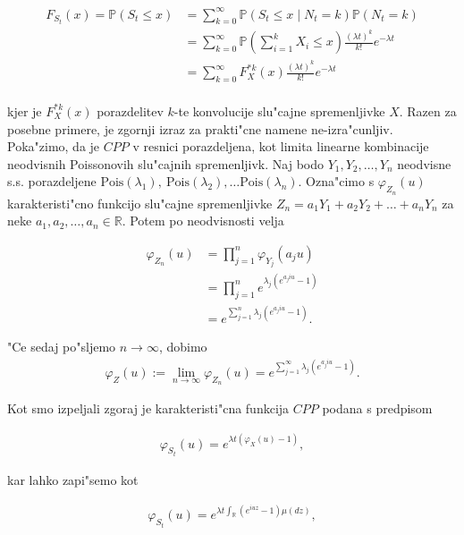 \documentclass[12pt, a4paper, reqno]{amsart}
\theoremstyle{definition} %
\theoremstyle{plain} %
\newcommand{\R}{\mathbb{R}}
\newcommand{\Prob}{\mathbb{P}}
\newcommand{\1}{\mathds{1}}
\newcommand{\Pois}[1]{\text{Pois}(#1)}
\begin{document}
    \begin{align*}
        F_{S_t}(x) = \Prob(S_t \leq x) 
        &= \sum_{k=0}^\infty \Prob(S_t \leq x \mid N_t = k)\Prob(N_t = k) \\
        & = \sum_{k=0}^\infty \Prob(\sum_{i=1}^k X_i \leq x)\frac{(\lambda t)^k}{k!}e^{-\lambda t} \\
        & = \sum_{k=0}^\infty F_X^{*k}(x)\frac{(\lambda t)^k}{k!}e^{-\lambda t} \\
    \end{align*}

    \noindent
    kjer je $F_X^{*k}(x)$ porazdelitev $k$-te konvolucije slu"cajne spremenljivke $X$. Razen za 
    posebne primere, je zgornji izraz za prakti"cne namene ne-izra"cunljiv. 
    Poka"zimo, da je $CPP$ v resnici porazdeljena, kot limita linearne kombinacije neodvisnih Poissonovih
    slu"cajnih spremenljivk. Naj bodo $Y_1, Y_2, \dots, Y_n$ neodvisne s.s. porazdeljene 
    $\Pois{\lambda_1}, \ \Pois{\lambda_2}, \dots \Pois{\lambda_n}$. Ozna"cimo s $\varphi_{Z_n}(u)$ 
    karakteristi"cno funkcijo slu"cajne spremenljivke $Z_n = a_1Y_1 + a_2Y_2 + \dots + a_nY_n$ za neke 
    $a_1, a_2, \dots, a_n \in \R$.
    Potem po neodvisnosti velja

    \begin{align*}
        \varphi_{Z_n}(u) 
                &= \prod_{j=1}^{n}\varphi_{Y_j}(a_ju)\\
                &= \prod_{j=1}^{n}e^{\lambda_j\left(e^{a_j i u} - 1\right)} \\
                &= e^{\sum_{j=1}^{n}\lambda_j\left(e^{a_j i u} - 1\right)}.
    \end{align*}

    \noindent
    "Ce sedaj po"sljemo $n \to \infty$, dobimo
    \begin{align}
        \varphi_{Z}(u) := \lim_{n\to\infty}\varphi_{Z_n}(u) = e^{\sum_{j=1}^{\infty}\lambda_j\left(e^{a_j i u} - 1\right)}.
        \label{eq:karFunkcVrste}
    \end{align}

    \noindent
    Kot smo izpeljali zgoraj je karakteristi"cna funkcija $CPP$ podana s predpisom

    \begin{align*}
        \varphi_{S_t}(u) = e^{\lambda t\left(\varphi_X(u) - 1\right)}, 
    \end{align*}

    \noindent
    kar lahko zapi"semo kot 

    \begin{align*}
        \varphi_{S_t}(u) = e^{\lambda t\int_{\R}\left(e^{i u z} - 1\right) \mu(dz)},
    \end{align*}
\end{document}

